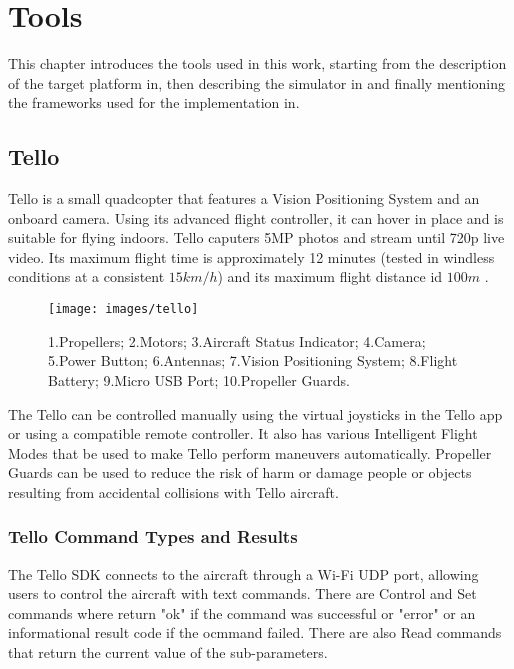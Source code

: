 \chapter{Tools}
\label{chap:impl}

This chapter introduces the tools used in this work, starting from the description of the target platform in, then describing the simulator in and finally mentioning the frameworks used for the implementation in.

\section{Tello}
\label{subsec:tello}
Tello is a small quadcopter that features a Vision Positioning System and an onboard camera. Using its advanced flight controller, it can hover in place and is suitable for flying indoors. Tello caputers 5MP photos and stream until 720p live video. Its maximum flight time is approximately 12 minutes (tested in windless conditions at a consistent $15km/h$) and its maximum flight distance id $100m$ \cite[]{djitelloguide}.

\begin{figure}[H]
	\centering
	\texttt{[image: images/tello]}
	\caption[Tello - Aircraft diagram.]{1.Propellers; 2.Motors; 3.Aircraft Status Indicator; 4.Camera; 5.Power Button; 6.Antennas; 7.Vision Positioning System; 8.Flight Battery; 9.Micro USB Port; 10.Propeller Guards.}
	\label{fig:telloairdiagr}
\end{figure}

\noindent The Tello can be controlled manually using the virtual joysticks in the Tello app or using a compatible remote controller. It also has various Intelligent Flight Modes that be used to make Tello perform maneuvers automatically. Propeller Guards can be used to reduce the risk of harm or damage people or objects resulting from accidental collisions with Tello aircraft.

\subsection{Tello Command Types and Results}
\label{subsec:tellosdk}
The Tello SDK connects to the aircraft through a Wi-Fi UDP port, allowing users to control the aircraft with text commands. There are Control and Set commands where return "ok" if the command was successful or "error" or an informational result code if the ocmmand failed. There are also Read commands that return the current value of the sub-parameters.

